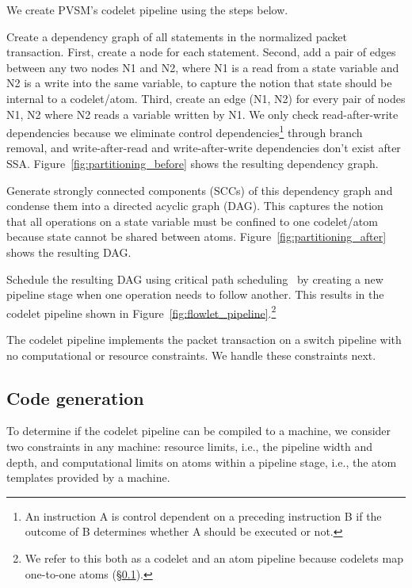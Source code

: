 We create PVSM's codelet pipeline using the steps below.
\begin{CompactEnumerate}
  \item Create a dependency graph of all statements in the normalized packet
    transaction. First, create a node for each statement. Second,
    add a pair of edges between any two nodes N1 and N2, where N1 is a read
    from a state variable and N2 is a write into the same variable, to capture
    the notion that state should be internal to a codelet/atom. Third, create
    an edge (N1, N2) for every pair of nodes N1, N2 where N2 reads a variable
    written by N1.  We only check read-after-write dependencies because we
    eliminate control dependencies\footnote{An instruction A is control
    dependent on a preceding instruction B if the outcome of B determines
    whether A should be executed or not.} through branch removal, and
    write-after-read and write-after-write dependencies don't exist after SSA.
    Figure~\ref{fig:partitioning_before} shows the resulting dependency graph.
  \item Generate strongly connected components (SCCs) of this dependency graph
    and condense them into a directed acyclic graph (DAG). This captures the notion that all
    operations on a state variable must be confined to one codelet/atom because
    state cannot be shared between atoms. Figure~\ref{fig:partitioning_after}
    shows the resulting DAG.
  \item Schedule the resulting DAG using critical path
    scheduling~\cite{crit_path_sched} by creating a new pipeline stage when one
    operation needs to follow another. This results in the codelet pipeline
    shown in Figure~\ref{fig:flowlet_pipeline}.\footnote{We refer to this both
    as a codelet and an atom pipeline because codelets map one-to-one atoms
  (\S\ref{ss:code_gen}).}
\end{CompactEnumerate}

The codelet pipeline implements the packet transaction on a switch pipeline
with no computational or resource constraints. We handle these constraints
next.

\subsection{Code generation}
\label{ss:code_gen}

To determine if the codelet pipeline can be compiled to a \absmachine machine,
we consider two constraints in any \absmachine machine: resource limits, i.e.,
the pipeline width and depth, and computational limits on atoms within a
pipeline stage, i.e., the atom templates provided by a \absmachine machine.

